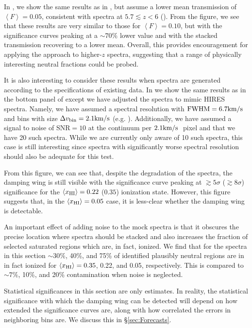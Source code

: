 In , we show the same results as in , but assume a lower mean transmission of $\left\langle F \right\rangle = 0.05$, consistent with spectra at $5.7 \lesssim z < 6$ (\citealt{Becker:2001ee}). From the figure, we see that these results are very similar to those for $\left\langle F \right\rangle = 0.10$, but with the significance curves peaking at a $\sim 70\%$ lower value and with the stacked transmission recovering to a lower mean. Overall, this provides encouragement for applying the approach to higher-$z$ spectra, suggesting that a range of physically interesting neutral fractions could be probed.


It is also interesting to consider these results when spectra are generated according to the specifications of existing data. In  we show the same results as in the bottom panel of  except we have adjusted the spectra to mimic HIRES spectra. Namely, we have assumed a spectral resolution with $\text{FWHM} = 6.7\kms\ $ and bins with size $\Delta v_{\text{bin}} = 2.1\text{km}/\text{s}$ (e.g. \citealt{Viel:2013fqw}). Additionally, we have assumed a signal to noise of $\text{SNR} = 10$ at the continuum per $2.1\text{km}/\text{s}\ $ pixel and that we have 20 such spectra. While we are currently only aware of 10 such spectra, this case is still interesting since spectra with significantly worse spectral resolution should also be adequate for this test. 


From this figure, we can see that, despite the degradation of the spectra, the damping wing is still visible with the significance curve peaking at $\gtrsim 5\sigma$ ($\gtrsim 8\sigma$) significance for the $\langle x_{\text{HI}}\rangle = 0.22$ ($0.35$) ionization state. However, this figure suggests that, in the $\langle x_{\text{HI}}\rangle = 0.05$ case, it is less-clear whether the damping wing is detectable. 



An important effect of adding noise to the mock spectra is that it obscures the precise location where spectra should be stacked and also increases the fraction of selected saturated regions which are, in fact, ionized. We find that for the spectra in this section $\sim 30\%$, 40\%, and 75\% of identified plausibly neutral regions are in in fact ionized for $\langle x_{\text{HI}}\rangle = 0.35$, 0.22, and 0.05, respectively. This is compared to $\sim 7\%$, 10\%, and 20\% contamination when noise is neglected.


Statistical significances in this section are only estimates. In reality, the statistical significance with which the damping wing can be detected will depend on how extended the significance curves are, along with how correlated the errors in neighboring bins are. We discuss this in \S\ref{sec:Forecasts}.


